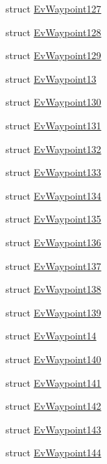 \begin{DoxyCompactItemize}
\item 
struct \hyperlink{structmove__base__z__client_1_1EvWaypoint127}{Ev\+Waypoint127}
\item 
struct \hyperlink{structmove__base__z__client_1_1EvWaypoint128}{Ev\+Waypoint128}
\item 
struct \hyperlink{structmove__base__z__client_1_1EvWaypoint129}{Ev\+Waypoint129}
\item 
struct \hyperlink{structmove__base__z__client_1_1EvWaypoint13}{Ev\+Waypoint13}
\item 
struct \hyperlink{structmove__base__z__client_1_1EvWaypoint130}{Ev\+Waypoint130}
\item 
struct \hyperlink{structmove__base__z__client_1_1EvWaypoint131}{Ev\+Waypoint131}
\item 
struct \hyperlink{structmove__base__z__client_1_1EvWaypoint132}{Ev\+Waypoint132}
\item 
struct \hyperlink{structmove__base__z__client_1_1EvWaypoint133}{Ev\+Waypoint133}
\item 
struct \hyperlink{structmove__base__z__client_1_1EvWaypoint134}{Ev\+Waypoint134}
\item 
struct \hyperlink{structmove__base__z__client_1_1EvWaypoint135}{Ev\+Waypoint135}
\item 
struct \hyperlink{structmove__base__z__client_1_1EvWaypoint136}{Ev\+Waypoint136}
\item 
struct \hyperlink{structmove__base__z__client_1_1EvWaypoint137}{Ev\+Waypoint137}
\item 
struct \hyperlink{structmove__base__z__client_1_1EvWaypoint138}{Ev\+Waypoint138}
\item 
struct \hyperlink{structmove__base__z__client_1_1EvWaypoint139}{Ev\+Waypoint139}
\item 
struct \hyperlink{structmove__base__z__client_1_1EvWaypoint14}{Ev\+Waypoint14}
\item 
struct \hyperlink{structmove__base__z__client_1_1EvWaypoint140}{Ev\+Waypoint140}
\item 
struct \hyperlink{structmove__base__z__client_1_1EvWaypoint141}{Ev\+Waypoint141}
\item 
struct \hyperlink{structmove__base__z__client_1_1EvWaypoint142}{Ev\+Waypoint142}
\item 
struct \hyperlink{structmove__base__z__client_1_1EvWaypoint143}{Ev\+Waypoint143}
\item 
struct \hyperlink{structmove__base__z__client_1_1EvWaypoint144}{Ev\+Waypoint144}
\item 

\end{DoxyCompactItemize}
